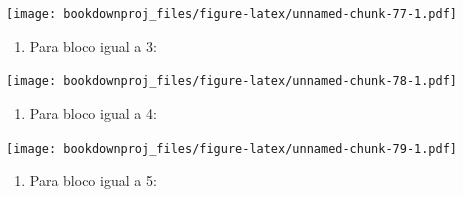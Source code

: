 \documentclass[
]{article}
\newenvironment{Shaded}{\begin{snugshade}}{\end{snugshade}}
\newcommand{\DataTypeTok}[1]{\textcolor[rgb]{0.13,0.29,0.53}{#1}}
\newcommand{\DecValTok}[1]{\textcolor[rgb]{0.00,0.00,0.81}{#1}}
\newcommand{\KeywordTok}[1]{\textcolor[rgb]{0.13,0.29,0.53}{\textbf{#1}}}
\newcommand{\NormalTok}[1]{#1}
\newcommand{\OperatorTok}[1]{\textcolor[rgb]{0.81,0.36,0.00}{\textbf{#1}}}
\newcommand{\StringTok}[1]{\textcolor[rgb]{0.31,0.60,0.02}{#1}}
\providecommand{\tightlist}{%
  \setlength{\itemsep}{0pt}\setlength{\parskip}{0pt}}
\begin{document}
\begin{Shaded}
\end{Shaded}

\texttt{[image: bookdownproj\_files/figure-latex/unnamed-chunk-77-1.pdf]}

\begin{enumerate}
\def\labelenumi{\arabic{enumi}.}
\setcounter{enumi}{2}
\tightlist
\item
  Para bloco igual a 3:
\end{enumerate}

\begin{Shaded}
\end{Shaded}

\texttt{[image: bookdownproj\_files/figure-latex/unnamed-chunk-78-1.pdf]}

\begin{enumerate}
\def\labelenumi{\arabic{enumi}.}
\setcounter{enumi}{3}
\tightlist
\item
  Para bloco igual a 4:
\end{enumerate}

\begin{Shaded}
\end{Shaded}

\texttt{[image: bookdownproj\_files/figure-latex/unnamed-chunk-79-1.pdf]}

\begin{enumerate}
\def\labelenumi{\arabic{enumi}.}
\setcounter{enumi}{4}
\tightlist
\item
  Para bloco igual a 5:
\end{enumerate}
\end{document}
